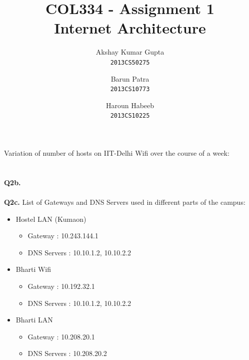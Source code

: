 \documentclass[12pt]{article}
\begin{document}
\title{COL334 - Assignment 1\\ Internet Architecture}
\author{Akshay Kumar Gupta\\\texttt{2013CS50275} \and  Barun Patra\\\texttt{2013CS10773} \and Haroun Habeeb\\\texttt{2013CS10225}}
\date{}
\maketitle
{} Variation of number of hosts on IIT-Delhi Wifi over the course of a week:\\
~
\\

{}
~
\\
{\bfseries Q2b.} \\ \\
{\bfseries Q2c.} List of Gateways and DNS Servers used in different parts of the campus:
\begin{itemize}
\item Hostel LAN (Kumaon)
\begin{itemize}
\item Gateway : 10.243.144.1
\item DNS Servers : 10.10.1.2, 10.10.2.2
\end{itemize}
\item Bharti Wifi
\begin{itemize}
\item Gateway : 10.192.32.1
\item DNS Servers : 10.10.1.2, 10.10.2.2
\end{itemize}
\item Bharti LAN
\begin{itemize}
\item Gateway : 10.208.20.1
\item DNS Servers : 10.208.20.2
\end{itemize}
\end{itemize}
\end{document}
